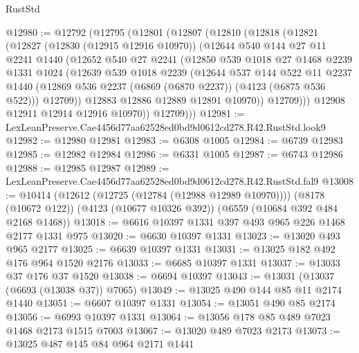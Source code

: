 \begin{lexlean}{RustStd}
\begin{coremodule}
@12980 := @12792
    (@12795
      (@12801
        (@12807
          (@12810
            (@12818
              (@12821
                (@12827
                  (@12830 (@12915 @12916 @10970))
                  (@12644
                    @540
                    @144
                    @27
                    @11
                    @2241
                    @1440
                    (@12652
                      @540
                      @27
                      @2241
                      (@12850
                        @539
                        @1018
                        @27
                        @1468
                        @2239
                        @1331
                        @1024
                        (@12639
                          @539
                          @1018
                          @2239
                          (@12644
                            @537
                            @144
                            @522
                            @11
                            @2237
                            @1440
                            (@12869 @536 @2237 (@6869 (@6870 @2237)) (@4123 (@6875 @536 @522)))
                            @12709))
                        @12883
                        @12886
                        @12889
                        @12891
                        @10970))
                    @12709)))
              @12908
              @12911
              @12914
              @12916
              @10970))
          @12709)))
@12981 := LexLeanPreserve.Cae4456d77aa62528ed0bd9d0612cd278.R42.RustStd.look9
@12982 := @12980 @12981
@12983 := @6308 @1005
@12984 := @6739 @12983
@12985 := @12982 @12984
@12986 := @6331 @1005
@12987 := @6743 @12986
@12988 := @12985 @12987
@12989 := LexLeanPreserve.Cae4456d77aa62528ed0bd9d0612cd278.R42.RustStd.fal9
@13008 := @10414
    (@12612 (@12725 (@12784 (@12988 @12989 @10970))))
    (@8178 (@10672 @122))
    (@4123 (@10677 @10326 @392))
    (@6559 (@10684 @392 @484 @2168 @1468))
@13018 := @6616 @10397 @1331 @397 @493 @965 @226 @1468 @2177 @1331 @975
@13020 := @6630 @10397 @1331
@13023 := @13020 @493 @965 @2177
@13025 := @6639 @10397 @1331
@13031 := @13025 @182 @492 @176 @964 @1520 @2176
@13033 := @6685 @10397 @1331
@13037 := @13033 @37 @176 @37 @1520
@13038 := @6694 @10397
@13043 := @13031 (@13037 (@6693 (@13038 @37)) @7065)
@13049 := @13025 @490 @144 @85 @11 @2174 @1440
@13051 := @6607 @10397 @1331
@13054 := @13051 @490 @85 @2174
@13056 := @6993 @10397 @1331
@13064 := @13056 @178 @85 @489 @7023 @1468 @2173 @1515 @7003
@13067 := @13020 @489 @7023 @2173
@13073 := @13025 @487 @145 @84 @964 @2171 @1441

\end{coremodule}
\end{lexlean}

